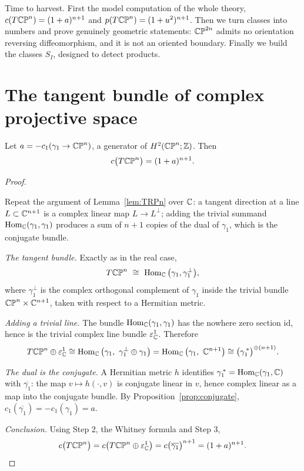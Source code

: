 \lecture

\begin{guiding}
Time to harvest. First the model computation of the whole theory,
$c(T\mathbb{CP}^n)=(1+a)^{n+1}$ and $p(T\mathbb{CP}^n)=(1+u^2)^{n+1}$. Then we turn classes into
numbers and prove genuinely geometric statements: $\mathbb{CP}^{2n}$ admits no
orientation reversing diffeomorphism, and it is not an oriented boundary.
Finally we build the classes $S_I$, designed to detect products.
\end{guiding}

\section{The tangent bundle of complex projective space}

\begin{theorem}\label{thm:cTCPn}
Let $a=-c_1(\gamma_1\to\mathbb{CP}^n)$, a generator of $H^2(\mathbb{CP}^n;\mathbb{Z})$. Then
\[
c\big(T\mathbb{CP}^n\big)=(1+a)^{n+1}.
\]
\end{theorem}

\begin{proof}
\begin{strategy}
Repeat the argument of Lemma~\ref{lem:TRPn} over $\mathbb{C}$: a tangent direction at a
line $L\subset\mathbb{C}^{n+1}$ is a complex linear map $L\to L^\perp$; adding the
trivial summand $\operatorname{Hom}_{\mathbb{C}}(\gamma_1,\gamma_1)$ produces a sum of $n+1$ copies of
the dual of $\gamma_1$, which is the conjugate bundle.
\end{strategy}

 \emph{The tangent bundle.} Exactly as in the real case,
\[
T\CP^n\ \iso\ \Hom_\C\big(\gamma_1,\gamma_1^{\perp}\big),
\]
where $\gamma_1^\perp$ is the complex orthogonal complement of $\gamma_1$ inside
the trivial bundle $\mathbb{CP}^n\times\mathbb{C}^{n+1}$, taken with respect to a Hermitian
metric.

 \emph{Adding a trivial line.} The bundle
$\operatorname{Hom}_{\mathbb{C}}(\gamma_1,\gamma_1)$ has the nowhere zero section $\mathrm{id}$, hence
is the trivial complex line bundle $\varepsilon^1_{\mathbb{C}}$. Therefore
\[
T\mathbb{CP}^n\oplus\varepsilon^1_{\mathbb{C}}
\cong\operatorname{Hom}_{\mathbb{C}}\big(\gamma_1,\ \gamma_1^\perp\oplus\gamma_1\big)
=\operatorname{Hom}_{\mathbb{C}}\big(\gamma_1,\ \mathbb{C}^{n+1}\big)
\cong\big(\gamma_1^{\,*}\big)^{\oplus(n+1)} .
\]

 \emph{The dual is the conjugate.} A Hermitian metric $h$ identifies
$\gamma_1^{\,*}=\operatorname{Hom}_{\mathbb{C}}(\gamma_1,\mathbb{C})$ with $\overline{\gamma_1}$: the map
$v\mapsto h(\cdot,v)$ is conjugate linear in $v$, hence complex linear as a map
into the conjugate bundle. By Proposition~\ref{prop:conjugate},
$c_1(\overline{\gamma_1})=-c_1(\gamma_1)=a$.

 \emph{Conclusion.} Using Step 2, the Whitney formula and Step 3,
\[
c\big(T\mathbb{CP}^n\big)=c\big(T\mathbb{CP}^n\oplus\varepsilon^1_{\mathbb{C}}\big)
=c\big(\overline{\gamma_1}\big)^{n+1}=(1+a)^{n+1}.
\]
\end{proof}

